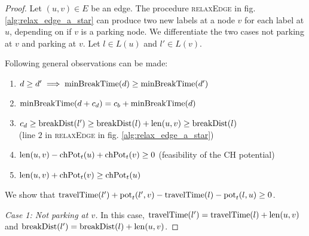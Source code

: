 \begin{proof}
	Let $(u,v) \in E$ be an edge. The procedure \textsc{relaxEdge} in fig. \ref{alg:relax_edge_a_star} can produce two new labels at a node $v$ for each label at $u$, depending on if $v$ is a parking node. We differentiate the two cases not parking at $v$ and parking at $v$. Let $l \in L(u)$ and $l' \in L(v)$.

	Following general observations can be made:

	\begin{enumerate}
		\item $d \ge d' \implies \operatorname{minBreakTime}(d) \ge \operatorname{minBreakTime}(d')$
		\item $\operatorname{minBreakTime}(d + c_d) = c_b + \operatorname{minBreakTime}(d)$
		\item $c_d \ge \operatorname{breakDist}(l') \ge \operatorname{breakDist}(l) + \operatorname{len}(u,v) \ge \operatorname{breakDist}(l)$\\(line $2$ in \textsc{relaxEdge} in fig. \ref{alg:relax_edge_a_star})
		\item   $\operatorname{len}(u,v) - \operatorname{chPot}_t(u)+ \operatorname{chPot}_t(v) \ge 0$ (feasibility of the CH potential)
		\item  $\operatorname{len}(u,v) + \operatorname{chPot}_t(v) \ge \operatorname{chPot}_t(u)$
	\end{enumerate}

	We show that $\operatorname{travelTime}(l') + \operatorname{pot}_t(l',v) - \operatorname{travelTime}(l) - \operatorname{pot}_t(l,u) \ge 0$.

	\emph{Case 1: Not parking at $v$.} In this case, $\operatorname{travelTime}(l') = \operatorname{travelTime}(l) + \operatorname{len}(u,v)$ and $\operatorname{breakDist}(l') = \operatorname{breakDist}(l) + \operatorname{len}(u,v)$.


\end{proof}
